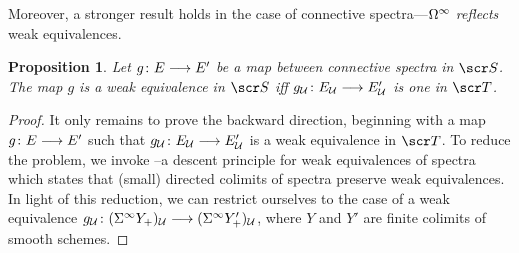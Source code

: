 \documentclass{amsart}
\newtheorem{prop}[thm]{Proposition}
\theoremstyle{definition}
\begin{document}
Moreover, a stronger result holds in the case of connective spectra---$\Omega^{\infty}$ \emph{reflects} weak equivalences.
\begin{prop}\label{prop:2.13}
Let $g \colon E \longrightarrow E'$ be a map between connective spectra in $\sS$. The map $g$ is a weak equivalence in $\sS$ iff $g_{{\mathcal{U}}} \colon E_{{\mathcal{U}}} \longrightarrow E'_{{\mathcal{U}}}$ is one in $\sT$. 
\end{prop}
\begin{proof}
It only remains to prove the backward direction, beginning with a map $g \colon E \longrightarrow E'$ such that $g_{{\mathcal{U}}} \colon E_{{\mathcal{U}}} \longrightarrow E'_{{\mathcal{U}}}$ is a weak equivalence in $\sT$.
To reduce the problem, we invoke \cite[Proposition 6.10]{Hu03}--a descent principle for weak equivalences of spectra which states that (small) directed colimits of spectra preserve weak equivalences. 
In light of this reduction, we can restrict ourselves to the case of a weak equivalence $g_{{\mathcal{U}}} \colon (\Sigma^{\infty} Y_+)_{{\mathcal{U}}} \longrightarrow (\Sigma^{\infty} Y'_+)_{{\mathcal{U}}}$, where $Y$ and $Y'$ are finite colimits of smooth schemes.


\end{proof}
\end{document}
